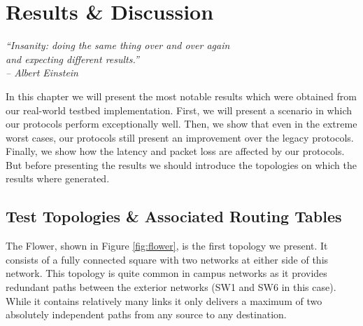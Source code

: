 \chapter{Results \& Discussion}
\label{chap:results}

\ifpdf
    \graphicspath{{7-Results/Chapter7Figs/PDF/}{7-Results/Plots/}}
\else
    \graphicspath{{7-Results/Chapter7Figs/}}
\fi

\begin{flushright}
 \textit{\textquotedblleft Insanity: doing the same thing over and over again \\
 and expecting different results.\textquotedblright}\\
\textit{-- Albert Einstein}
\end{flushright}


In this chapter we will present the most notable results which were obtained
from our real-world testbed implementation. First, we will present a scenario
in which our protocols perform exceptionally well. Then, we show that even in
the extreme worst cases, our protocols still present an improvement over the
legacy protocols. Finally, we show how the latency and packet loss are affected by our
protocols. But before presenting the results we should introduce the topologies
on which the results where generated.

\section{Test Topologies \& Associated Routing Tables}

The Flower, shown in Figure \ref{fig:flower}, is the first topology we present.
It consists of a fully connected square with two networks at either side of this
network. This topology is quite common in campus networks as it provides
redundant paths between the exterior networks (SW1 and SW6 in this case). While
it contains relatively many links it only delivers a maximum of two absolutely
independent paths from any source to any destination. 



